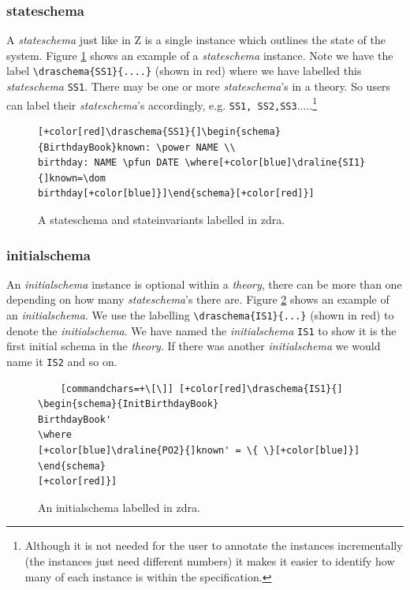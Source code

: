 \subsubsection{stateschema}

A \emph{stateschema} just like in Z is a single instance which outlines the
state of the system. Figure \ref{fig:exampleofss} shows an example of a
\emph{stateschema} instance. Note we have the label \verb|\draschema{SS1}{....}|
(shown in red) where we have labelled this \emph{stateschema} \verb|SS1|. There
may be one or more \emph{stateschema}'s in a theory. So users can label their
\emph{stateschema}'s accordingly, e.g.
\verb|SS1, SS2,SS3|.....\footnote{Although it is not needed for the user to annotate the
instances incrementally (the instances just need different numbers) it makes it
easier to identify how many of each instance is within the specification.}

\begin{figure}[H]
\centering
\begin{footnotesize}
\begin{BVerbatim}[commandchars=+\[\]]
[+color[red]\draschema{SS1}{]\begin{schema}{BirthdayBook}known: \power NAME \\
birthday: NAME \pfun DATE \where[+color[blue]\draline{SI1}{]known=\dom
birthday[+color[blue]}]\end{schema}[+color[red]}]
\end{BVerbatim}
\end{footnotesize}
\caption{\label{fig:exampleofss} A stateschema and stateinvariants labelled in \gls{zdra}.}
\end{figure}

\subsubsection{initialschema}

An \emph{initialschema} instance is optional within a \emph{theory}, there can
be more than one depending on how many \emph{stateschema}'s there are. Figure
\ref{fig:exampleofis} shows an example of an \emph{initialschema}. We use the
labelling \verb|\draschema{IS1}{...}| (shown in red) to denote the
\emph{initialschema}. We have named the \emph{initialschema} \verb|IS1| to show
it is the first initial schema in the \emph{theory}. If there was another
\emph{initialschema} we would name it \verb|IS2| and so on.

\begin{figure}[H]
\centering
\begin{footnotesize}
\begin{BVerbatim}
    [commandchars=+\[\]] [+color[red]\draschema{IS1}{]
\begin{schema}{InitBirthdayBook} 
BirthdayBook' 
\where 
[+color[blue]\draline{PO2}{]known' = \{ \}[+color[blue]}]
\end{schema}
[+color[red]}]
\end{BVerbatim}
\caption{\label{fig:exampleofis} An initialschema labelled in \gls{zdra}.}
\end{footnotesize}
\end{figure}

